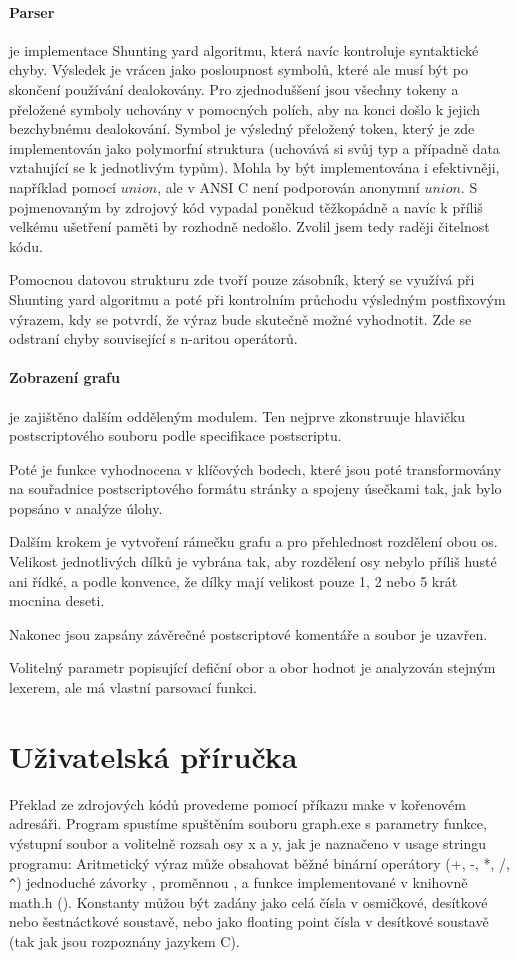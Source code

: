 \documentclass[11pt]{article}
\begin{document}
\paragraph{Parser}
je implementace Shunting yard algoritmu, která navíc kontroluje syntaktické
chyby. Výsledek je vrácen jako posloupnost symbolů, které ale musí být po
skončení používání dealokovány. Pro zjednoduššení jsou všechny tokeny a
přeložené symboly uchovány v pomocných polích, aby na konci došlo k jejich
bezchybnému dealokování. Symbol je výsledný přeložený token, který je zde
implementován jako polymorfní struktura (uchovává si svůj typ a případně data
vztahující se k jednotlivým typům). Mohla by být implementována i efektivněji,
například pomocí $union$, ale v ANSI C není podporován anonymní $union$. S
pojmenovaným by zdrojový kód vypadal poněkud těžkopádně a navíc k příliš
velkému ušetření paměti by rozhodně nedošlo. Zvolil jsem tedy raději čitelnost
kódu. 

Pomocnou datovou strukturu zde tvoří pouze zásobník, který se využívá při
Shunting yard algoritmu a poté při kontrolním průchodu výsledným postfixovým
výrazem, kdy se potvrdí, že výraz bude skutečně možné vyhodnotit. Zde se
odstraní chyby související s n-aritou operátorů.

\paragraph{Zobrazení grafu}
je zajištěno dalším odděleným modulem. Ten nejprve zkonstruuje hlavičku
postscriptového souboru podle specifikace postscriptu. 

Poté je funkce vyhodnocena v klíčových bodech, které jsou poté transformovány
na souřadnice postscriptového formátu stránky a spojeny úsečkami tak, jak bylo
popsáno v analýze úlohy. 

Dalším krokem je vytvoření rámečku grafu a pro přehlednost rozdělení obou os.
Velikost jednotlivých dílků je vybrána tak, aby rozdělení osy nebylo příliš
husté ani řídké, a podle konvence, že dílky mají velikost pouze 1, 2 nebo 5
krát mocnina deseti.

Nakonec jsou zapsány závěrečné postscriptové komentáře a soubor je uzavřen.

Volitelný parametr popisující defiční obor a obor hodnot je analyzován stejným
lexerem, ale má vlastní parsovací funkci.

\section{Uživatelská příručka}
Překlad ze zdrojových kódů provedeme pomocí příkazu make v kořenovém adresáři.
Program spustíme spuštěním souboru graph.exe s parametry funkce, výstupní
soubor a volitelně rozsah osy x a y, jak je naznačeno v usage stringu programu:
Aritmetický výraz může obsahovat běžné binární operátory (+, -, *, /, \verb|^|)
jednoduché závorky \uv{()}, proměnnou , a funkce implementované v knihovně math.h (). Konstanty můžou být zadány jako celá čísla v osmičkové, desítkové nebo šestnáctkové soustavě, nebo jako floating point čísla v desítkové soustavě (tak jak jsou rozpoznány jazykem C).
\end{document}
